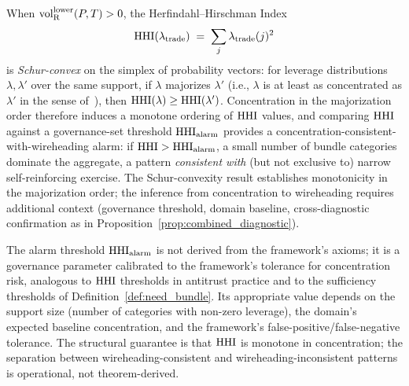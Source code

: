 \begin{proposition}
\label{prop:wireheading_hhi}
When ${\operatorname{vol}_{\mathrm{R}}^{\mathrm{lower}}}(P, T) > 0$, the Herfindahl--Hirschman
Index~\citep{rhoades1993herfindahl}
\[
  \mathrm{HHI}(\lambda_{\mathrm{trade}}) \;=\;
  \sum_{j} \lambda_{\mathrm{trade}}(j)^2
\]
is \emph{Schur-convex} on the simplex of probability vectors:
for leverage distributions $\lambda, \lambda'$ over the same
support, if $\lambda$ majorizes $\lambda'$ (i.e., $\lambda$ is
at least as concentrated as $\lambda'$ in the sense
of~\citet{hardy1929majorization}), then $\mathrm{HHI}(\lambda) \geq
\mathrm{HHI}(\lambda')$.  Concentration in the majorization order
therefore induces a monotone ordering of $\mathrm{HHI}$ values, and
comparing $\mathrm{HHI}$ against a governance-set threshold
$\mathrm{HHI}_{\mathrm{alarm}}$ provides a
concentration-consistent-with-wireheading alarm: if
$\mathrm{HHI} > \mathrm{HHI}_{\mathrm{alarm}}$, a small number of bundle
categories dominate the aggregate, a pattern \emph{consistent
with} (but not exclusive to) narrow self-reinforcing exercise.
The Schur-convexity result establishes monotonicity in the
majorization order; the inference from concentration to
wireheading requires additional context (governance
threshold, domain baseline, cross-diagnostic confirmation as
in Proposition~\ref{prop:combined_diagnostic}).
\end{proposition}

\begin{remark}
\label{rem:hhi_alarm_governance}
The alarm threshold $\mathrm{HHI}_{\mathrm{alarm}}$ is not derived from
the framework's axioms; it is a governance parameter calibrated
to the framework's tolerance for concentration risk, analogous
to $\mathrm{HHI}$ thresholds in antitrust practice and to the sufficiency
thresholds of Definition~\ref{def:need_bundle}.  Its appropriate
value depends on the support size (number of categories with
non-zero leverage), the domain's expected baseline concentration,
and the framework's false-positive/false-negative tolerance.
The structural guarantee is that $\mathrm{HHI}$ is monotone in
concentration; the separation between wireheading-consistent and
wireheading-inconsistent patterns is operational, not
theorem-derived.
\end{remark}

